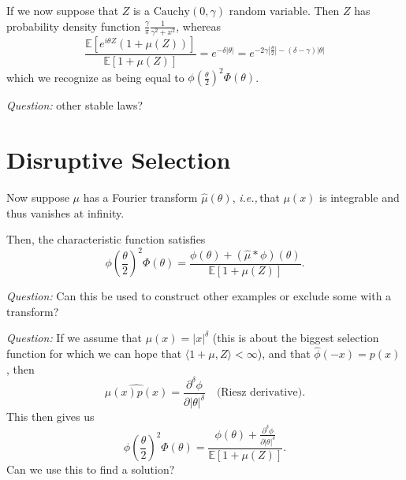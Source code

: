 \documentclass[11pt]{amsart}
\theoremstyle{remark}
\theoremstyle{definition}
\newcommand{\ie}{\textit{i.e.,}\,}
\begin{document}
If we now suppose that $Z$ is a $\text{Cauchy}(0,\gamma)$ random variable.  Then $Z$ has probability density function $\frac{\gamma}{\pi} \frac{1}{\gamma^{2} + x^{2}}$, whereas 
\[
	\frac{\mathbb{E}\left[e^{i \theta Z}(1+\mu(Z))\right]}{\mathbb{E}[1+\mu(Z)]}
	= e^{-\delta |\theta|} = e^{-2\gamma \left|\frac{\theta}{2}\right|-(\delta-\gamma)|\theta|}
\]
which we recognize as being equal to $\phi\left(\frac{\theta}{2}\right)^{2} \Phi(\theta)$. 


\bigskip

\noindent\emph{Question:} other stable laws?

\section{Disruptive Selection}

Now suppose $\mu$ has a Fourier transform $\hat{\mu}(\theta)$, \ie that $\mu(x)$ is integrable and thus vanishes at infinity.

Then, the characteristic function satisfies 
\[
	{\textstyle \phi\left(\frac{\theta}{2}\right)^{2}} \Phi(\theta) =
	\frac{ \phi(\theta) + (\widehat{\mu} * \phi)(\theta)} {\mathbb{E}[1+\mu(Z)]}.
\]

\noindent\emph{Question:} Can this be used to construct other examples or exclude some with a transform?

\noindent\emph{Question:} If we assume that $\mu(x) = |x|^{\delta}$ (this is about the biggest selection function for which we can hope that $\langle 1+\mu, Z\rangle < \infty$), and that $\hat{\phi}(-x) = p(x)$,  then 
\[
	\widehat{\mu(x)p(x)}  = \frac{\partial^{\delta}\phi}{\partial |\theta|^{\delta}} \quad \text{(Riesz derivative).}
\]
This then gives us 
\[
	{\textstyle \phi\left(\frac{\theta}{2}\right)^{2}} \Phi(\theta) =
	\frac{ \phi(\theta) +\frac{\partial^{\delta}\phi}{\partial |\theta|^{\delta}}} {\mathbb{E}[1+\mu(Z)]}.
\]
Can we use this to find a solution?



\end{document}
